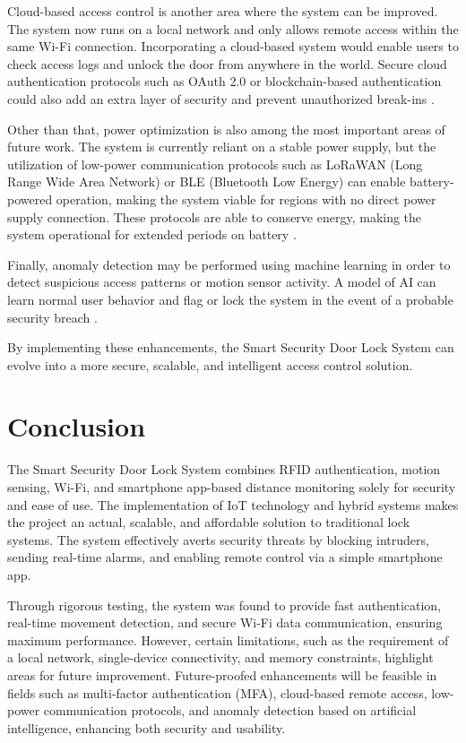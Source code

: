 \documentclass[a4paper]{scrartcl}
\begin{document}
Cloud-based access control is another area where the system can be improved. The system now runs on a local network and only allows remote access within the same Wi-Fi connection. Incorporating a cloud-based system would enable users to check access logs and unlock the door from anywhere in the world. Secure cloud authentication protocols such as OAuth 2.0 or blockchain-based authentication could also add an extra layer of security and prevent unauthorized break-ins \cite{Shirali2023}.

Other than that, power optimization is also among the most important areas of future work. The system is currently reliant on a stable power supply, but the utilization of low-power communication protocols such as LoRaWAN (Long Range Wide Area Network) or BLE (Bluetooth Low Energy) can enable battery-powered operation, making the system viable for regions with no direct power supply connection. These protocols are able to conserve energy, making the system operational for extended periods on battery \cite{LoRaLock2022}.

Finally, anomaly detection may be performed using machine learning in order to detect suspicious access patterns or motion sensor activity. A model of AI can learn normal user behavior and flag or lock the system in the event of a probable security breach \cite{Tiwari2024}.

By implementing these enhancements, the Smart Security Door Lock System can evolve into a more secure, scalable, and intelligent access control solution.


\section{Conclusion }
\label{sec:conclusion}
The Smart Security Door Lock System combines RFID authentication, motion sensing, Wi-Fi, and smartphone app-based distance monitoring solely for security and ease of use. The implementation of IoT technology and hybrid systems makes the project an actual, scalable, and affordable solution to traditional lock systems. The system effectively averts security threats by blocking intruders, sending real-time alarms, and enabling remote control via a simple smartphone app.

Through rigorous testing, the system was found to provide fast authentication, real-time movement detection, and secure Wi-Fi data communication, ensuring maximum performance. However, certain limitations, such as the requirement of a local network, single-device connectivity, and memory constraints, highlight areas for future improvement. Future-proofed enhancements will be feasible in fields such as multi-factor authentication (MFA), cloud-based remote access, low-power communication protocols, and anomaly detection based on artificial intelligence, enhancing both security and usability.
\end{document}
